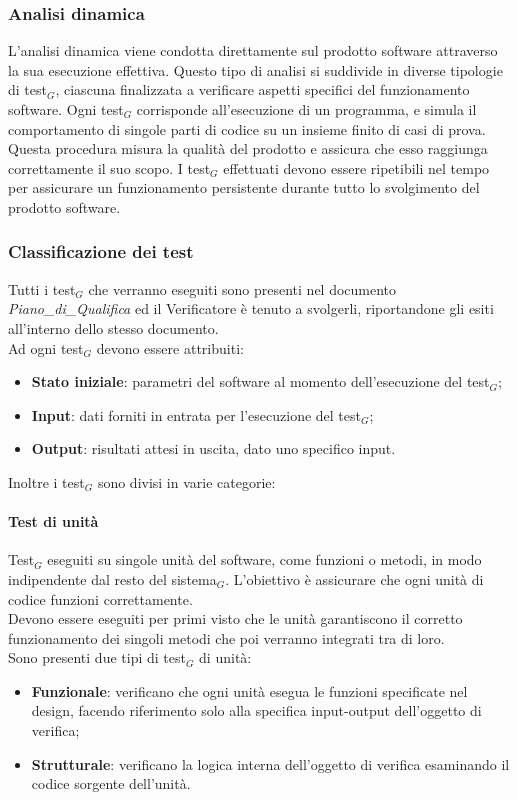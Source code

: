 \documentclass[10pt]{article}
\begin{document}
\begin{justify}
    \subsubsection{Analisi dinamica}
    L'analisi dinamica viene condotta direttamente sul prodotto software attraverso la sua esecuzione effettiva. Questo tipo di analisi si suddivide in diverse tipologie di test$_G$, ciascuna finalizzata a verificare aspetti specifici del funzionamento software. Ogni test$_G$ corrisponde all'esecuzione di un programma, e simula il comportamento di singole parti di codice su un insieme finito di casi di prova.\\
    Questa procedura misura la qualità del prodotto e assicura che esso raggiunga correttamente il suo scopo. I test$_G$ effettuati devono essere ripetibili nel tempo per assicurare un funzionamento persistente durante tutto lo svolgimento del prodotto software.
    
    \subsubsection{Classificazione dei test}
    Tutti i test$_G$ che verranno eseguiti sono presenti nel documento \textit{Piano\_di\_Qualifica} ed il Verificatore è tenuto a svolgerli, riportandone gli esiti all'interno dello stesso documento.\\
    Ad ogni test$_G$ devono essere attribuiti:
    \begin{itemize}
    \item \textbf{Stato iniziale}: parametri del software al momento dell'esecuzione del test$_G$;
    \item \textbf{Input}: dati forniti in entrata per l'esecuzione del test$_G$;
    \item \textbf{Output}: risultati attesi in uscita, dato uno specifico input.
    \end{itemize}
    Inoltre i test$_G$ sono divisi in varie categorie:

    \paragraph{Test di unità}
    Test$_G$ eseguiti su singole unità del software, come funzioni o metodi, in modo indipendente dal resto del sistema$_G$. L'obiettivo è assicurare che ogni unità di codice funzioni correttamente.\\
    Devono essere eseguiti per primi visto che le unità garantiscono il corretto funzionamento dei singoli metodi che poi verranno integrati tra di loro.\\
    Sono presenti due tipi di test$_G$ di unità:
    \begin{itemize}
    \item \textbf{Funzionale}: verificano che ogni unità esegua le funzioni specificate nel design, facendo riferimento solo alla specifica input-output dell'oggetto di verifica;
    \item \textbf{Strutturale}: verificano la logica interna dell'oggetto di verifica esaminando il codice sorgente dell'unità.
    \end{itemize}


\end{justify}
\end{document}
